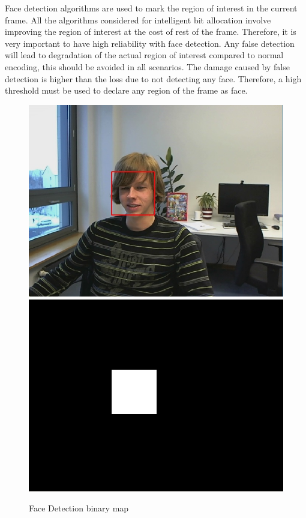 \documentclass[11pt]{article} %
\begin{document}
Face detection algorithms are used to mark the region of interest in the current frame. All the algorithms considered for intelligent bit allocation involve improving the region of interest at the cost of rest of the frame. Therefore, it is very important to have high reliability with face detection. Any false detection will lead to degradation of the actual region of interest compared to normal encoding, this should be avoided in all scenarios. The damage caused by false detection is higher than the loss due to not detecting any face. Therefore, a high threshold must be used to declare any region of the frame as face.
\begin{figure}[!h]
    \centering
    \includegraphics[scale=0.4]{PaulDefault120FaceRecognized}
    \includegraphics[scale=0.4]{PaulDefault120FaceMap}
    \caption{Face Detection binary map}
    \label{fig:PaulDefault120FaceMap}
\end{figure}
\end{document}
